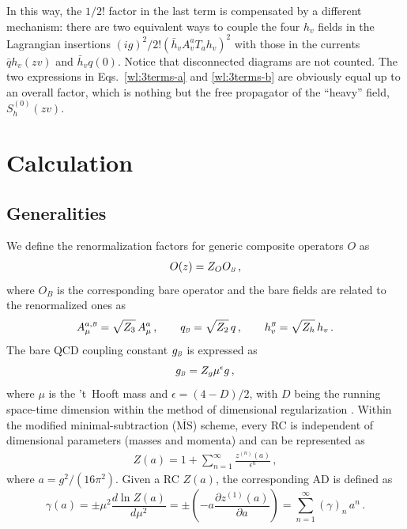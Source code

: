 \documentclass[12pt]{article}
\numberwithin{equation}{section}
\newcommand{\1}[1]{\mathbf{1}^{#1}}
\newcommand{\2}[1]{\mathbf{2}^{#1}}
\newcommand{\3}[1]{\mathbf{3}^{#1}}
\newcommand{\4}[1]{\mathbf{4}^{#1}}
\newcommand{\5}[1]{\mathbf{5}^{#1}}
\newcommand{\mlabel}[1]{ \text{\footnotesize \hspace{3mm}\fbox{\fbox{$#1$}} \label{#1}}}
\renewcommand{\mlabel}[1]{\label{#1}}
\newcommand{\ep}{\epsilon}
\newcommand{\beq}{\begin{equation}}
\newcommand{\eeq}{\end{equation}}
\begin{document}
In this way, the $1/2!$ factor in the last term is compensated by a different
mechanism: there are two equivalent ways to couple the four $h_v$ fields in
the Lagrangian insertions $ (ig)^2/2! \left(\bar{h}_v A_v^a T_a h_v \right)^2$
with those in the currents $\bar{q} h_v (z v)$ and $\bar{h}_vq(0)$.
Notice that disconnected diagrams are not counted.  The two expressions in
Eqs.~\eqref{wl:3terms-a} and \eqref{wl:3terms-b} are obviously equal up to an
overall factor, which is nothing but the free propagator of the ``heavy''
field, $S_h^{(0)}(zv)$.
\section{Calculation}
\label{sec:three}
\subsection{Generalities}
\newcommand{\sB}{\scalebox{.55}{$B$}}
We define the renormalization factors for generic composite operators  $O$ as
\begin{align}
    O(z) = Z_O O_{\sB}\,,    
\mlabel{def:Z}
\end{align}
where $O_B$ is the corresponding bare operator and  the bare fields are related to the 
renormalized ones as
\beq
A_{\mu}^{a, \sB} = \sqrt{Z_3}\,A_{\mu}^{a}\,, \qquad 
q_{\sB}  =  \sqrt{Z_2}\,  q\,, \qquad
h_v^{\sB} = \sqrt{Z_h} \, h_v\,.
\mlabel{RfromB:fields}
\eeq
The bare QCD coupling constant $g_{\sB}$ is expressed as
\beq
g_{\sB}   = Z_g \mu^{\ep}g\,,
\eeq
where $\mu$ is  the {}'t~Hooft mass and $\ep =(4-D)/2$, with  $D$ being
the running space-time dimension within  the method of dimensional regularization
\cite{Cicuta:1972jf,Ashmore:1972uj,tHooft:1972fi}.
Within the modified minimal-subtraction ($\overline{\mbox{MS}}$) scheme, every
RC is independent of dimensional parameters (masses and momenta) and can
be represented as
 \begin{eqnarray} 
Z(a) = 1 + \sum_{n=1}^\infty \frac{z^{(n)}(a)}{ \epsilon ^n}
\mlabel{}
\,,
 \end{eqnarray} 
where $a = g^2/(16 \pi^2)$.
Given a RC $Z(a)$,  the  corresponding AD is defined as
 \begin{equation} 
\gamma(a) = \pm \mu^2\frac{d \ln Z(a)}{d \mu^2}
=\pm \left( -  a \frac{ \partial  z^{(1)}(a)}{ \partial  a}\right)
=  \sum_{n=1}^\infty (\gamma)_n \, a^{n} 
\mlabel{anom:dim:generic}
\,.
\end{equation}
\end{document}

